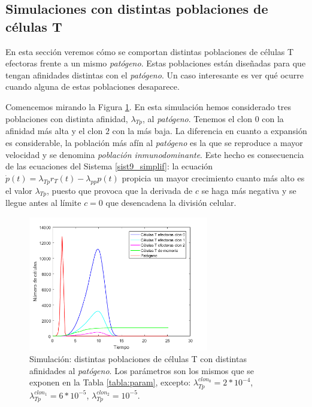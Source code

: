 \subsection{Simulaciones con distintas poblaciones de células T}

En esta sección veremos cómo se comportan distintas poblaciones de células T efectoras frente a un mismo \textit{patógeno}. Estas poblaciones están diseñadas para que tengan afinidades distintas con el \textit{patógeno}. Un caso interesante es ver qué ocurre cuando alguna de estas poblaciones desaparece. 

Comencemos mirando la Figura \ref{fig:tresClones}. En esta simulación hemos considerado tres poblaciones con distinta afinidad, $\lambda_{Tp}$, al \textit{patógeno}. Tenemos el clon $0$ con la afinidad más alta y el clon $2$ con la más baja. La diferencia en cuanto a expansión es considerable, la población más afín al \textit{patógeno} es la que se reproduce a mayor velocidad y se denomina \textit{población inmunodominante}. Este hecho es consecuencia de las ecuaciones del Sistema \ref{sist9_simplif}: la ecuación $\dot{p}(t) = \lambda_{Tp}r_{T}(t) - \lambda_{pp}p(t)$ propicia un mayor crecimiento cuanto más alto es el valor $\lambda_{Tp}$, puesto que provoca que la derivada de $c$ se haga más negativa y se llegue antes al límite $c = 0$ que desencadena la división celular.

\begin{figure}[t]
	\centering
	\includegraphics[width=0.7\textwidth]{Imagenes/Simulaciones/tresClones}
	\caption{Simulación: distintas poblaciones de células T con distintas afinidades al \textit{patógeno}. Los parámetros son los mismos que se exponen en la Tabla \ref{tabla:param}, excepto: $\lambda_{Tp}^{clon_0} = 2*10^{-4}$, $\lambda_{Tp}^{clon_1} = 6*10^{-5}$, $\lambda_{Tp}^{clon_2} = 10^{-5}$.}
	\label{fig:tresClones}
\end{figure}


